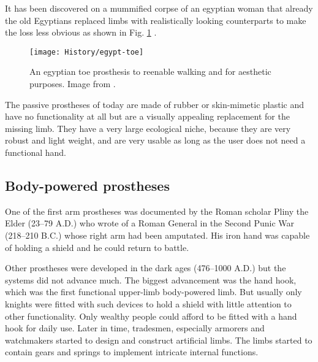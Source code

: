 \documentclass[main]{subfiles}
\begin{document}
It has been discovered on a mummified corpse of an egyptian woman that already the old Egyptians replaced limbs with realistically looking counterparts to make the loss less obvious as shown in Fig. \ref{first-prosthesis} \cite{first-prosthesis,amputee-coalition}.

\begin{figure}[htp]
\centering
\texttt{[image: History/egypt-toe]}
\caption[Egyptian toe prosthesis]{An egyptian toe prosthesis to reenable walking and for aesthetic purposes. Image from \cite{first-prosthesis,amputee-coalition}.}
\label{first-prosthesis}
\end{figure}

The passive prostheses of today are made of rubber or skin-mimetic plastic and have no functionality at all but are a visually appealing replacement for the missing limb. They have a very large ecological niche, because they are very robust and light weight, and are very usable as long as the user does not need a functional hand.

\subsection{Body-powered prostheses}

One of the first arm prostheses was documented by the Roman scholar Pliny the Elder (23--79 A.D.) who wrote of a Roman General in the Second Punic War (218--210 B.C.) whose right arm had been amputated. His iron hand was capable of holding a shield and he could return to battle\cite{amputee-coalition}.

Other prostheses were developed in the dark ages (476--1000 A.D.) but the systems did not advance much. The biggest advancement was the hand hook, which was the first functional upper-limb body-powered limb. But usually only knights were fitted with such devices to hold a shield with little attention to other functionality. Only wealthy people could afford to be fitted with a hand hook for daily use. Later in time, tradesmen, especially armorers and watchmakers started to design and construct artificial limbs. The limbs started to contain gears and springs to implement intricate internal functions.

\begin{figure}[htp]
\hspace{0.15\textwidth}
\end{figure}
\end{document}
